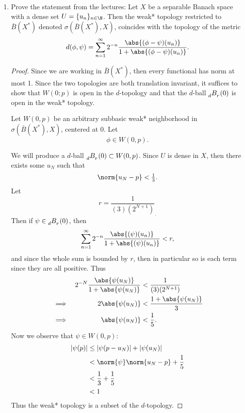 \documentclass[12pt,letterpaper]{article}
\let\oldphi\phi
\renewcommand{\phi}{\varphi}
\renewcommand{\closure}{\bar}
\begin{document}
\begin{enumerate}
\renewcommand{\B}{\closure{B}(X^*)}
\renewcommand{\phi}{\oldphi}
\newcommand{\dball}{\tensor[_d]{B}{_{r}}(0)}
\item Prove the statement from the lectures: Let $X$ be a separable Banach space with a dense set $U=\{u_n\}_{n\in\N}$.
Then the weak* topology restricted to $\B$ denoted $\sigma(\B,X)$, 
coincides with the topology of the metric
$$d(\phi,\psi)=\sum_{n=1}^\infty 2^{-n} \frac{\abs{(\phi-\psi)(u_n)}}{1+\abs{(\phi-\psi)(u_n)}}.$$

\begin{proof}
Since we are working in $\B$, then every functional has norm at most 1. Since the two topologies are both translation invariant, it suffices to show that $W(0;p)$ is open in the $d$-topology and that the $d$-ball $\tensor[_d]{B}{_{r}}(0)$ is open in the weak* topology. 

\pagebreak

Let $W(0,p)$ be an arbitrary subbasic weak* neighborhood in $\sigma(\B,X)$, centered at 0. Let 
$$\phi\in W(0,p).$$

We will produce a $d$-ball $\dball \subset W(0,p)$. 
Since $U$ is dense in $X$, then there exists some $u_N$ such that 
$$\norm{u_N-p}<\tfrac{1}{3}.$$
Let
$$r=\frac{1}{(3)(2^{N+1})}_.$$
Then if $\psi \in \dball$, then
$$\sum_{n=1}^\infty 2^{-n} \frac{\abs{(\psi)(u_n)}}{1+\abs{(\psi)(u_n)}} < r,$$
and since the whole sum is bounded by $r$, then in particular so is each term since they are all positive. Thus
\begin{alignat*}{3}
&&2^{-N} \frac{\abs{\psi(u_N)}}{1+\abs{\psi(u_N)}} & < \frac{1}{(3)(2^{N+1})} \\
&\implies &2{\abs{\psi(u_N)}} &< \frac{1+\abs{\psi(u_N)}}{3} \\
&\implies &{\abs{\psi(u_N)}} &< \frac{1}{5}.
\end{alignat*}
Now we observe that $\psi\in W(0,p)$:
\begin{align*}
|\psi(p)|&\leq |\psi(p-u_N)| + |\psi(u_N)| \\
&< \norm{\psi}\norm{u_N-p} + \frac{1}{5} \\
&< \frac{1}{3} + \frac{1}{5}\\
&< 1
\end{align*}
Thus the weak* topology is a subset of the $d$-topology. \qedwhite


\end{proof}
\end{enumerate}
\end{document}
